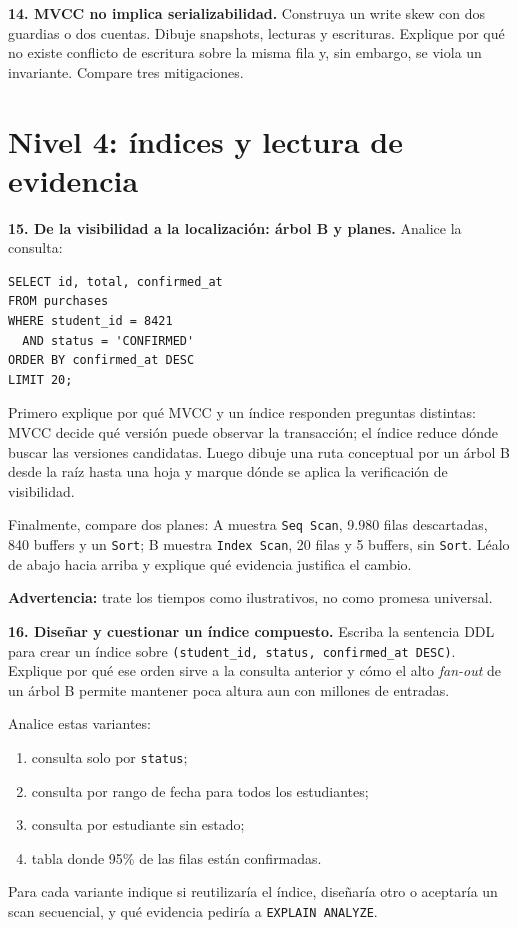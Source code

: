 \documentclass[variant=guia,cover=institutional,mode=screen]{ua-engineering-v6-article}
\begin{document}
\begin{uaexercise}
\textbf{14. MVCC no implica serializabilidad.} Construya un write skew con dos guardias o dos cuentas. Dibuje snapshots, lecturas y escrituras. Explique por qué no existe conflicto de escritura sobre la misma fila y, sin embargo, se viola un invariante. Compare tres mitigaciones.
\end{uaexercise}

\section{Nivel 4: índices y lectura de evidencia}

\begin{uaexercise}
\textbf{15. De la visibilidad a la localización: árbol B y planes.} Analice la consulta:

\begin{verbatim}
SELECT id, total, confirmed_at
FROM purchases
WHERE student_id = 8421
  AND status = 'CONFIRMED'
ORDER BY confirmed_at DESC
LIMIT 20;
\end{verbatim}

Primero explique por qué MVCC y un índice responden preguntas distintas: MVCC decide qué versión puede observar la transacción; el índice reduce dónde buscar las versiones candidatas. Luego dibuje una ruta conceptual por un árbol B desde la raíz hasta una hoja y marque dónde se aplica la verificación de visibilidad.

Finalmente, compare dos planes: A muestra \texttt{Seq Scan}, 9.980 filas descartadas, 840 buffers y un \texttt{Sort}; B muestra \texttt{Index Scan}, 20 filas y 5 buffers, sin \texttt{Sort}. Léalo de abajo hacia arriba y explique qué evidencia justifica el cambio.

\textbf{Advertencia:} trate los tiempos como ilustrativos, no como promesa universal.
\end{uaexercise}

\begin{uaexercise}
\textbf{16. Diseñar y cuestionar un índice compuesto.} Escriba la sentencia DDL para crear un índice sobre \texttt{(student\_id, status, confirmed\_at DESC)}. Explique por qué ese orden sirve a la consulta anterior y cómo el alto \emph{fan-out} de un árbol B permite mantener poca altura aun con millones de entradas.

Analice estas variantes:

\begin{enumerate}
\item consulta solo por \texttt{status};
\item consulta por rango de fecha para todos los estudiantes;
\item consulta por estudiante sin estado;
\item tabla donde 95\% de las filas están confirmadas.
\end{enumerate}

Para cada variante indique si reutilizaría el índice, diseñaría otro o aceptaría un scan secuencial, y qué evidencia pediría a \texttt{EXPLAIN ANALYZE}.
\end{uaexercise}
\end{document}
